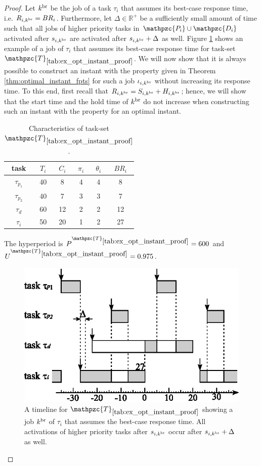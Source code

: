 \begin{proof}
	\iffalse
	Let $k^{\rm{br}}$ be the job of a task $\tau_i$ that assumes its best-case response time, i.e. $R_{i,k^{\rm{br}}} = BR_i$. Furthermore, let $\Delta \in \mathbb{R^+}$ be a sufficiently small amount of time such that all jobs of higher priority tasks in $\mathpzc{P_i} \cup \mathpzc{D_i}$ activated after $s_{i,k^{\rm{br}}}$ are activated after $s_{i,k^{\rm{br}}}+\Delta$ as well. Figure \ref{fig:optimal_instant_proof_1} shows an example of a job of $\tau_i$ that assumes its best-case response time for task-set $\mathpzc{T}_{\ref{tab:ex_opt_instant_proof}}$. We will now show that it is always possible to construct an instant with the property given in Theorem \ref{thm:optimal_instant_fpts} for such a job $\iota_{i,k^{\rm{br}}}$ without increasing its response time. To this end, first recall that $R_{i,k^{\rm{\rm{br}}}} = S_{i,k^{\rm{br}}} + H_{i,k^{\rm{br}}}$; hence, we will show that the start time and the hold time of $k^{\rm{br}}$ do not increase when constructing such an instant with the property for an optimal instant.
	
	
	\begin{table}[h]
		\center
		\caption{Characteristics of task-set $\mathpzc{T}_{\ref{tab:ex_opt_instant_proof}}$.}
		\label{tab:ex_opt_instant_proof}
		\begin{tabular}{c | c c c c | c}
			\hline 
			task & $T_i$ & $C_i$ & $\pi_i$ & $\theta_i$ & $BR_i$\\ 
			\hline 
			$\tau_{p_1}$& 40 & 8  & 4 & 4 & 8\\ 
			$\tau_{p_2}$& 40 & 7  & 3 & 3 & 7\\ 
			$\tau_d$& 60 & 12 & 2 & 2 & 12\\ 
			$\tau_i$& 50 & 20 & 1 & 2 & 27\\
			\hline 
		\end{tabular}
		\small
		\item The hyperperiod is $P^{\mathpzc{T}_{\ref{tab:ex_opt_instant_proof}}}=600$ and $U^{\mathpzc{T}_{\ref{tab:ex_opt_instant_proof}}}=0.975$.
	\end{table}
	
	\begin{figure}[h]
		\centering
		\includegraphics[width=0.45\linewidth]{figures/optimal_instant_proof_1_new} 
		\caption{A timeline for $\mathpzc{T}_{\ref{tab:ex_opt_instant_proof}}$ showing a job $k^{\rm{br}}$ of $\tau_i$ that assumes the best-case response time. All activations of higher priority tasks after $s_{i,k^{\rm{br}}}$ occur after $s_{i,k^{\rm{br}}} + \Delta$ as well.}
		\label{fig:optimal_instant_proof_1}
	\end{figure}
	

\end{proof}
